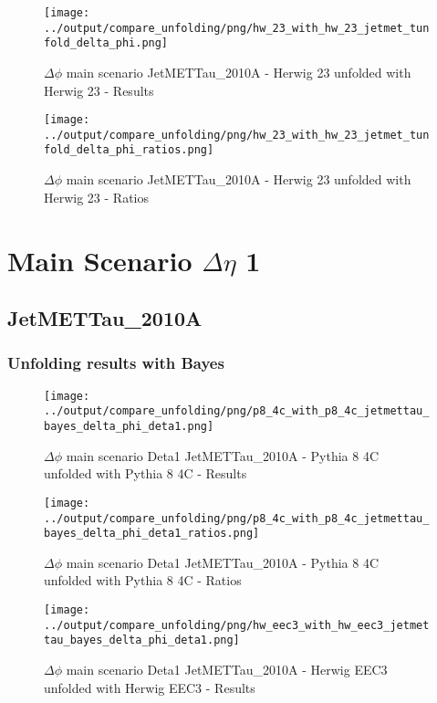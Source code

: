 \documentclass[11pt]{book}
\begin{document}
\begin{figure}[ht]
\centering
\texttt{[image: ../output/compare\_unfolding/png/hw\_23\_with\_hw\_23\_jetmet\_tunfold\_delta\_phi.png]}
\caption{$\Delta\phi$ main scenario JetMETTau\_2010A - Herwig 23 unfolded with Herwig 23 - Results}
\label{hw_23_hw_23_jetmet_tunfold_delta_phi_a}
\end{figure}

\begin{figure}[ht]
\centering
\texttt{[image: ../output/compare\_unfolding/png/hw\_23\_with\_hw\_23\_jetmet\_tunfold\_delta\_phi\_ratios.png]}
\caption{$\Delta\phi$ main scenario JetMETTau\_2010A - Herwig 23 unfolded with Herwig 23 - Ratios}
\label{hw_23_jetmet_tunfold_delta_phi_b}
\end{figure}



\clearpage
\chapter{Main Scenario $\Delta\eta$ 1 }
\section{JetMETTau\_2010A}
\subsection{Unfolding results with Bayes}

\begin{figure}[ht]
\centering
\texttt{[image: ../output/compare\_unfolding/png/p8\_4c\_with\_p8\_4c\_jetmettau\_bayes\_delta\_phi\_deta1.png]}
\caption{$\Delta\phi$ main scenario Deta1 JetMETTau\_2010A - Pythia 8 4C unfolded with Pythia 8 4C - Results}
\label{p8_p8_jetmettau_bayes_delta_phi_deta1_a}
\end{figure}

\begin{figure}[ht]
\centering
\texttt{[image: ../output/compare\_unfolding/png/p8\_4c\_with\_p8\_4c\_jetmettau\_bayes\_delta\_phi\_deta1\_ratios.png]}
\caption{$\Delta\phi$ main scenario Deta1 JetMETTau\_2010A - Pythia 8 4C unfolded with Pythia 8 4C - Ratios}
\label{p8_p8_jetmettau_bayes_delta_phi_deta1_b}
\end{figure}

\begin{figure}[ht]
\centering
\texttt{[image: ../output/compare\_unfolding/png/hw\_eec3\_with\_hw\_eec3\_jetmettau\_bayes\_delta\_phi\_deta1.png]}
\caption{$\Delta\phi$ main scenario Deta1 JetMETTau\_2010A - Herwig EEC3 unfolded with Herwig EEC3 - Results}
\label{hw_eec3_hw_eec3_jetmettau_bayes_delta_phi_deta1_a}
\end{figure}
\end{document}

